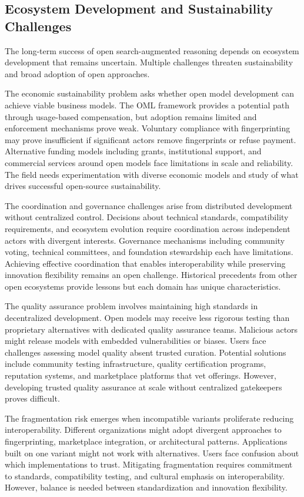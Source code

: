 \subsection{Ecosystem Development and Sustainability Challenges}

The long-term success of open search-augmented reasoning depends on ecosystem development that remains uncertain. Multiple challenges threaten sustainability and broad adoption of open approaches.

The economic sustainability problem asks whether open model development can achieve viable business models. The OML framework provides a potential path through usage-based compensation, but adoption remains limited and enforcement mechanisms prove weak. Voluntary compliance with fingerprinting may prove insufficient if significant actors remove fingerprints or refuse payment. Alternative funding models including grants, institutional support, and commercial services around open models face limitations in scale and reliability. The field needs experimentation with diverse economic models and study of what drives successful open-source sustainability.

The coordination and governance challenges arise from distributed development without centralized control. Decisions about technical standards, compatibility requirements, and ecosystem evolution require coordination across independent actors with divergent interests. Governance mechanisms including community voting, technical committees, and foundation stewardship each have limitations. Achieving effective coordination that enables interoperability while preserving innovation flexibility remains an open challenge. Historical precedents from other open ecosystems provide lessons but each domain has unique characteristics.

The quality assurance problem involves maintaining high standards in decentralized development. Open models may receive less rigorous testing than proprietary alternatives with dedicated quality assurance teams. Malicious actors might release models with embedded vulnerabilities or biases. Users face challenges assessing model quality absent trusted curation. Potential solutions include community testing infrastructure, quality certification programs, reputation systems, and marketplace platforms that vet offerings. However, developing trusted quality assurance at scale without centralized gatekeepers proves difficult.

The fragmentation risk emerges when incompatible variants proliferate reducing interoperability. Different organizations might adopt divergent approaches to fingerprinting, marketplace integration, or architectural patterns. Applications built on one variant might not work with alternatives. Users face confusion about which implementations to trust. Mitigating fragmentation requires commitment to standards, compatibility testing, and cultural emphasis on interoperability. However, balance is needed between standardization and innovation flexibility.

